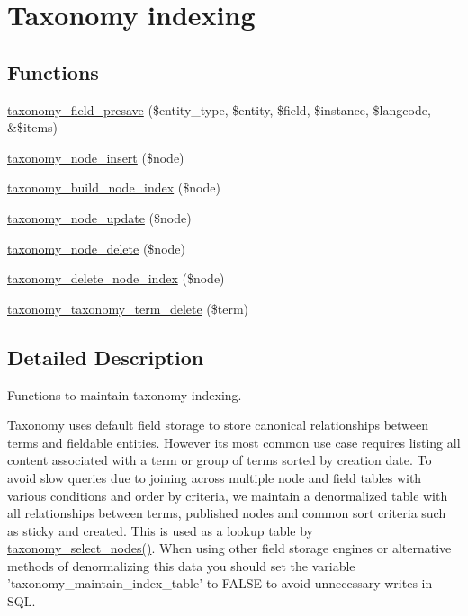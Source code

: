 \hypertarget{group__taxonomy__index}{
\section{Taxonomy indexing}
\label{group__taxonomy__index}
}
\subsection*{Functions}
\begin{DoxyCompactItemize}
\item 
\hyperlink{group__taxonomy__index_ga153d69020ee8a88cd17e1836b184972a}{taxonomy\_\-field\_\-presave} (\$entity\_\-type, \$entity, \$field, \$instance, \$langcode, \&\$items)
\item 
\hyperlink{group__taxonomy__index_ga48e783c30c362615a8747a02e49c8c32}{taxonomy\_\-node\_\-insert} (\$node)
\item 
\hyperlink{group__taxonomy__index_ga3ace4aed11277879b4c85d0ee8001fdc}{taxonomy\_\-build\_\-node\_\-index} (\$node)
\item 
\hyperlink{group__taxonomy__index_gac6d5a5135886afdfe870c657df502908}{taxonomy\_\-node\_\-update} (\$node)
\item 
\hyperlink{group__taxonomy__index_gae47bb910cad247043b7ce8fda691ef74}{taxonomy\_\-node\_\-delete} (\$node)
\item 
\hyperlink{group__taxonomy__index_ga5c48fc5228e67a255b15133e218ad1e9}{taxonomy\_\-delete\_\-node\_\-index} (\$node)
\item 
\hyperlink{group__taxonomy__index_ga560abdef7f1cccbd2eb55f6ae78ac10e}{taxonomy\_\-taxonomy\_\-term\_\-delete} (\$term)
\end{DoxyCompactItemize}


\subsection{Detailed Description}
Functions to maintain taxonomy indexing.

Taxonomy uses default field storage to store canonical relationships between terms and fieldable entities. However its most common use case requires listing all content associated with a term or group of terms sorted by creation date. To avoid slow queries due to joining across multiple node and field tables with various conditions and order by criteria, we maintain a denormalized table with all relationships between terms, published nodes and common sort criteria such as sticky and created. This is used as a lookup table by \hyperlink{taxonomy_8module_af8fa429d60d3978bce025539b018b95f}{taxonomy\_\-select\_\-nodes()}. When using other field storage engines or alternative methods of denormalizing this data you should set the variable 'taxonomy\_\-maintain\_\-index\_\-table' to FALSE to avoid unnecessary writes in SQL. 

